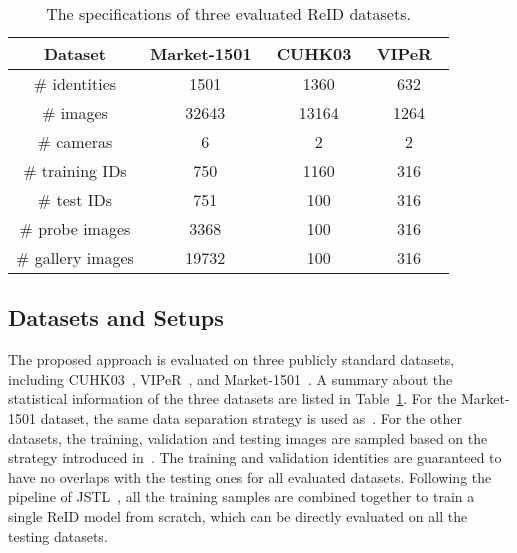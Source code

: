 \documentclass[10pt,twocolumn,letterpaper]{article}
\begin{document}
\begin{table}
\begin{center}
\begin{footnotesize}
\begin{tabular}{c|ccc}
\hline
Dataset & Market-1501~\cite{zheng2015scalable} & CUHK03~\cite{li2014deepreid} & VIPeR~\cite{gray2007evaluating} \\\hline
\# identities & 1501 & 1360 & 632\\
\# images & 32643 & 13164 & 1264\\
\# cameras & 6 & 2 & 2\\\hline
\# training IDs & 750 & 1160 & 316\\\hline
\# test IDs & 751 & 100 & 316\\
\# probe images & 3368 & 100 & 316\\
\# gallery images & 19732 & 100 & 316\\\hline
\end{tabular}
\end{footnotesize}
\caption{The specifications of three evaluated ReID datasets.}
\label{tab:datasets}
\vspace{-0.3cm}
\end{center}
\end{table}



\subsection{Datasets and Setups}

The proposed approach is evaluated on three publicly standard datasets, including
CUHK03~\cite{li2014deepreid}, VIPeR~\cite{gray2007evaluating}, and Market-1501~\cite{zheng2015scalable}.
%
A summary about the statistical information of the three datasets are listed in Table~\ref{tab:datasets}.
For the Market-1501 dataset, the same data separation strategy is used as~\cite{zheng2015scalable}.
%
For the other datasets, the training, validation and testing images are sampled based on the strategy introduced in~\cite{xiao2016learning}.
%
The training and validation identities are guaranteed to have no overlaps with the testing ones for all evaluated datasets.
%
Following the pipeline of JSTL~\cite{xiao2016learning}, all the training samples are combined together to train a single ReID model from scratch, which can be directly evaluated on all the testing datasets.
\end{document}
